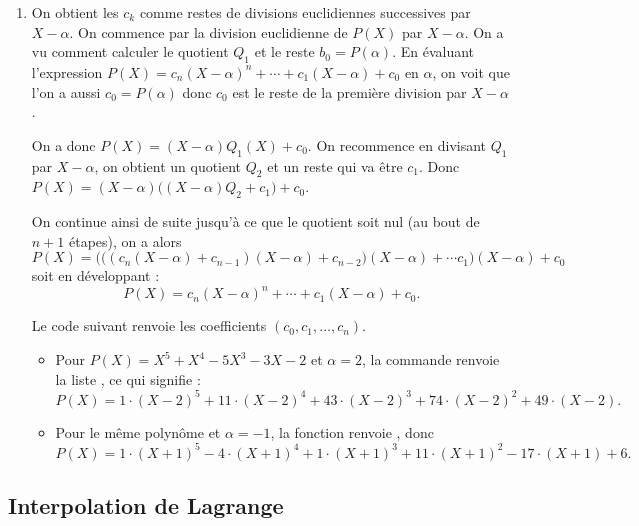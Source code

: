 \documentclass[class=report,crop=false]{standalone}
\begin{document}
\begin{enumerate}
\begin{enumerate}
\begin{itemize}
    \end{itemize}    
    
    \item On obtient les $c_k$ comme restes de divisions euclidiennes successives par $X-\alpha$.
    On commence par la division euclidienne de $P(X)$ par $X-\alpha$.
    On a vu comment calculer le quotient $Q_1$ et le reste $b_0 = P(\alpha)$.
    En évaluant l'expression 
    $P(X) = c_n (X-\alpha)^n+ \cdots + c_1(X-\alpha) + c_0$ en $\alpha$, on voit que l'on a aussi 
    $c_0 = P(\alpha)$ donc $c_0$ est le reste de la première division par $X-\alpha$.
    
    On a donc $P(X) = (X-\alpha)Q_1(X) + c_0$.
    On recommence en divisant $Q_1$ par $X-\alpha$, on obtient un quotient $Q_2$ et un reste qui va être $c_1$. Donc
    $P(X) = (X-\alpha)\big( (X-\alpha)Q_2+c_1 \big) + c_0$.
    
    On continue ainsi de suite jusqu'à ce que le quotient soit nul (au bout de $n+1$ étapes), on a alors 
    $$P(X) =  \Big(\big((c_n (X-\alpha)+c_{n-1})(X-\alpha) +c_{n-2} \big) (X-\alpha) + \cdots c_1\Big) (X-\alpha) +c_0$$    
    soit en développant :
    $$P(X) = c_n (X-\alpha)^n+ \cdots + c_1(X-\alpha) + c_0.$$
    
    Le code suivant renvoie les coefficients $(c_0,c_1,\ldots,c_n)$.
    
    \begin{itemize}
      \item Pour $P(X) = X^5 + X^4 - 5X^3 - 3X - 2$ 
    et $\alpha = 2$, la commande 
    renvoie la liste \codeinline{[0, 49, 74, 43, 11, 1]}, ce qui signifie :
    $$P(X) = 1\cdot(X-2)^5+11\cdot (X-2)^4+43\cdot(X-2)^3+74\cdot(X-2)^2+49\cdot(X-2).$$
    
    
      \item Pour le même polynôme et $\alpha = -1$, la fonction renvoie 
      \codeinline{[6, -17, 11, 1, -4, 1]}, donc
    $$P(X) = 1\cdot(X+1)^5-4\cdot (X+1)^4+1\cdot(X+1)^3+11\cdot(X+1)^2-17\cdot(X+1)+6.$$      
  
    \end{itemize}
  \end{enumerate}
\end{enumerate}


\subsection{Interpolation de Lagrange}
\end{document}

